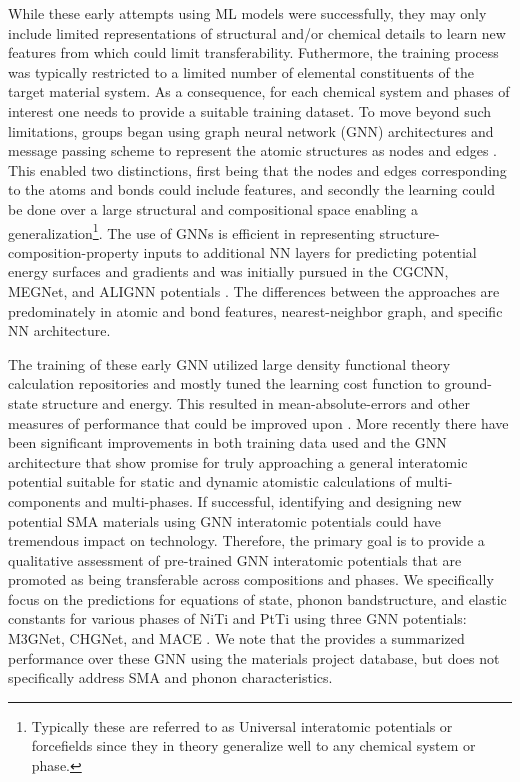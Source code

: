\documentclass[preprint,colorlinks=true,linkcolor=black,citecolor=black]{elsarticle}
\begin{document}
While these early attempts using ML models were successfully, they may
only include limited representations of structural and/or chemical
details to learn new features from which could limit
transferability. Futhermore, the training process was typically
restricted to a limited number of elemental constituents of the target
material system. As a consequence, for each chemical system and phases
of interest one needs to provide a suitable training dataset. To move
beyond such limitations, groups began using graph neural network (GNN)
architectures and message passing scheme to represent the atomic
structures as nodes and edges \cite{Reiser2022}. This enabled two
distinctions, first being that the nodes and edges corresponding to
the atoms and bonds could include features, and secondly the learning
could be done over a large structural and compositional space enabling
a generalization\footnote{Typically these are referred to as Universal
	interatomic potentials or forcefields since they in theory
	generalize well to any chemical system or phase.}. The use of GNNs
is efficient in representing structure-composition-property inputs to
additional NN layers for predicting potential energy surfaces and
gradients and was initially pursued in the CGCNN, MEGNet, and ALIGNN
potentials \cite{Choudhary2021,Chen2019,Xie2018}. The differences
between the approaches are predominately in atomic and bond features,
nearest-neighbor graph, and specific NN architecture. \par

The training of these early GNN utilized large density functional
theory calculation repositories and mostly tuned the learning cost
function to ground-state structure and energy. This resulted in
mean-absolute-errors and other measures of performance that could be
improved upon \cite{Riebesell2023}. More recently there have been
significant improvements in both training data used and the GNN
architecture that show promise for truly approaching a general
interatomic potential suitable for static and dynamic atomistic
calculations of multi-components and multi-phases. If successful,
identifying and designing new potential SMA materials using GNN
interatomic potentials could have tremendous impact on
technology. Therefore, the primary goal is to provide a qualitative
assessment of pre-trained GNN interatomic potentials that are promoted
as being transferable across compositions and phases. We specifically
focus on the predictions for equations of state, phonon bandstructure,
and elastic constants for various phases of NiTi and PtTi using three
GNN potentials: M3GNet, CHGNet, and MACE
\cite{Chen2022,Deng2023,Batatia2022}. We note that the
\citet{Riebesell2023} provides a summarized performance over these GNN
using the materials project database, but does not specifically
address SMA and phonon characteristics. \par
\end{document}
